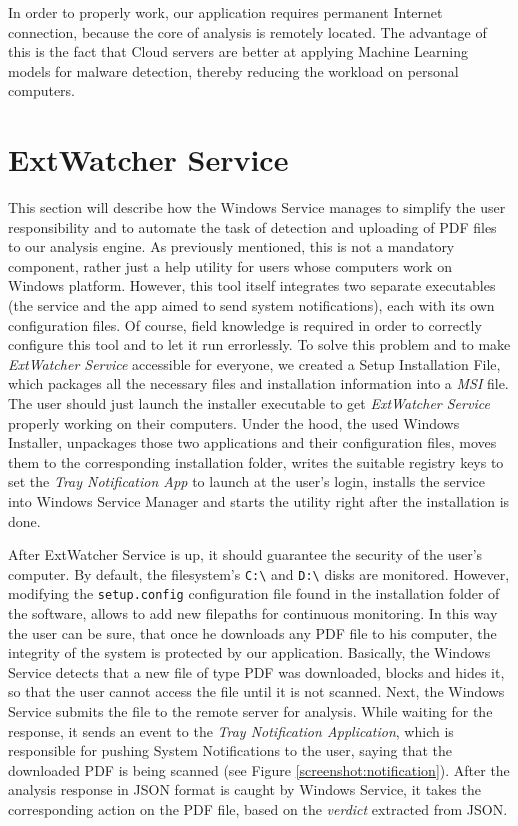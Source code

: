 In order to properly work, our application requires permanent Internet connection, because the core of analysis is remotely located. The advantage of this is the fact that Cloud servers are better at applying Machine Learning models for malware detection, thereby reducing the workload on personal computers. 


\section{ExtWatcher Service}
\label{section:winService}
This section will describe how the Windows Service manages to simplify the user responsibility and to automate the task of detection and uploading of PDF files to our analysis engine. As previously mentioned, this is not a mandatory component, rather just a help utility for users whose computers work on Windows platform. However, this tool itself integrates two separate executables (the service and the app aimed to send system notifications), each with its own configuration files. Of course, field knowledge is required in order to correctly configure this tool and to let it run errorlessly. To solve this problem and to make \textit{ExtWatcher Service} accessible for everyone, we created a Setup Installation File, which packages all the necessary files and installation information into a \textit{MSI} file. The user should just launch the installer executable to get \textit{ExtWatcher Service} properly working on their computers. Under the hood, the used Windows Installer, unpackages those two applications and their configuration files, moves them to the corresponding installation folder, writes the suitable registry keys to set the \textit{Tray Notification App} to launch at the user's login, installs the service into Windows Service Manager and starts the utility right after the installation is done. \par
After ExtWatcher Service is up, it should guarantee the security of the user's computer. By default, the filesystem's \texttt{C:\textbackslash} and \texttt{D:\textbackslash} disks are monitored. However, modifying the \texttt{setup.config} configuration file found in the installation folder of the software, allows to add new filepaths for continuous monitoring. In this way the user can be sure, that once he downloads any PDF file to his computer, the integrity of the system is protected by our application. Basically, the Windows Service detects that a new file of type PDF was downloaded, blocks and hides it, so that the user cannot access the file until it is not scanned. Next, the Windows Service submits the file to the remote server for analysis. While waiting for the response, it sends an event to the \textit{Tray Notification Application}, which is responsible for pushing System Notifications to the user, saying that the downloaded PDF is being scanned (see Figure \ref{screenshot:notification}). After the analysis response in JSON format is caught by Windows Service, it takes the corresponding action on the PDF file, based on the \textit{verdict} extracted from JSON. 

